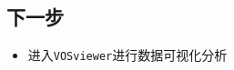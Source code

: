 \documentclass[11pt]{article}
\providecommand{\tightlist}{%
      \setlength{\itemsep}{0pt}\setlength{\parskip}{0pt}}
\begin{document}
    \subsection{下一步}\label{ux4e0bux4e00ux6b65}

\begin{itemize}
\tightlist
\item
  进入\texttt{VOSviewer}进行数据可视化分析
\end{itemize}


    
    
    
\end{document}
